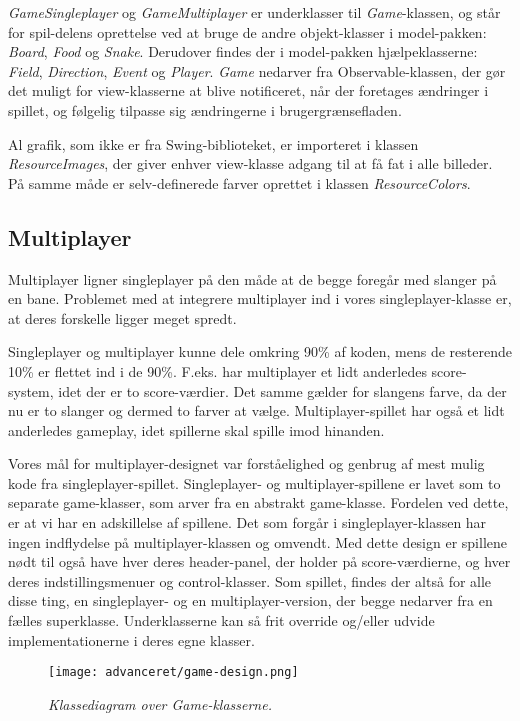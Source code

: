 \textit{GameSingleplayer} og \textit{GameMultiplayer} er underklasser til \textit{Game}-klassen, og står for spil-delens oprettelse ved at bruge de andre objekt-klasser i model-pakken: \textit{Board}, \textit{Food} og \textit{Snake}. Derudover findes der i model-pakken hjælpeklasserne: \textit{Field}, \textit{Direction}, \textit{Event} og \textit{Player}. \textit{Game} nedarver fra Observable-klassen, der gør det muligt for view-klasserne at blive notificeret, når der foretages ændringer i spillet, og følgelig tilpasse sig ændringerne i brugergrænsefladen.
\newline

Al grafik, som ikke er fra Swing-biblioteket, er importeret i klassen \textit{ResourceImages}, der giver enhver view-klasse adgang til at få fat i alle billeder. På samme måde er selv-definerede farver oprettet i klassen \textit{ResourceColors}.


\subsection{Multiplayer}
Multiplayer ligner singleplayer på den måde at de begge foregår med slanger på en bane. Problemet med at integrere multiplayer ind i vores singleplayer-klasse er, at deres forskelle ligger meget spredt.

Singleplayer og multiplayer kunne dele omkring 90\% af koden, mens de resterende 10\% er flettet ind i de 90\%. F.eks. har multiplayer et lidt anderledes score-system, idet der er to score-værdier. Det samme gælder for slangens farve, da der nu er to slanger og dermed to farver at vælge. Multiplayer-spillet har også et lidt anderledes gameplay, idet spillerne skal spille imod hinanden.

Vores mål for multiplayer-designet var forståelighed og genbrug af mest mulig kode fra singleplayer-spillet. Singleplayer- og multiplayer-spillene er lavet som to separate game-klasser, som arver fra en abstrakt game-klasse. Fordelen ved dette, er at vi har en adskillelse af spillene. Det som forgår i singleplayer-klassen har ingen indflydelse på multiplayer-klassen og omvendt. Med dette design er spillene nødt til også have hver deres header-panel, der holder på score-værdierne, og hver deres indstillingsmenuer og control-klasser. Som spillet, findes der altså for alle disse ting, en singleplayer- og en multiplayer-version, der begge nedarver fra en fælles superklasse. Underklasserne kan så frit override og/eller udvide implementationerne i deres egne klasser.

\begin{figure}[h]
	\centering
	\graphicspath{ {pics/} }
   \texttt{[image: advanceret/game-design.png]}
	\hspace{0.1\textwidth}
	\caption{\textit{Klassediagram over Game-klasserne.}}
\end{figure}

